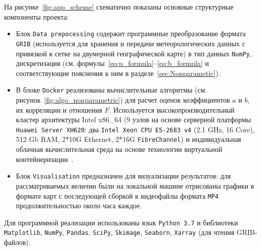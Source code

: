 На рисунке~\ref{fig:app_scheme} схематично показаны основные структурные компоненты проекта:
\begin{itemize}
	\item Блок \verb"Data prepocessing" содержит программные преобразование формата \verb"GRIB" (используется для хранения и передачи метеорологических данных с привязкой к сетке на двумерной географической карте) в тип данных \verb"NumPy", дискретизация (см. формулы~\eqref{eq:p_formula}--\eqref{eq:b_formula} и соответствующие пояснения к ним в разделе~\ref{sec:Nonparametic}).
	\item В блоке \verb"Docker" реализованы вычислительные алгоритмы (см. рисунок~\ref{fig:algo_nonparametric}) для расчет оценок коэффициентов $a$ и $b$, их корреляции и отношения $F$. Используется высокопроизводительный кластер архитектуры Intel x86\_64 (9 узлов на основе серверной платформы \verb"Huawei Server XH620": два \verb"Intel Xeon CPU E5-2683 v4" (2.1 GHz, 16 Core), 512 Gb RAM, 2*10G Ethernet, 2*16G \verb"FibreChannel") и индивидуальная облачная вычислительная среда на основе технологии виртуальной контейнеризации~\cite{peinl2016docker}.
	\item Блок \verb"Visualisation" предназначен для визуализации результатов: для рассматриваемых величин были на локальной машине отрисованы графики в формате карт с последующей сборкой в видеофайлы формата \verb"MP4" продолжительностью около часа каждое.
\end{itemize}

Для программной реализации использованы язык \verb"Python 3.7" и библиотеки \verb"Matplotlib", \verb"NumPy", \verb"Pandas", \verb"SciPy", \verb"Skimage", \verb"Seaborn", \verb"Xarray" (для чтения GRIB-файлов).







